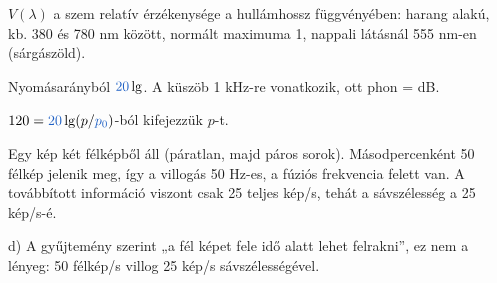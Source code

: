 $V(\lambda)$ a szem relatív érzékenysége a hullámhossz függvényében: harang alakú, kb. 380 és 780 nm között, normált maximuma 1, nappali látásnál 555 nm-en (sárgászöld).

Nyomásarányból ${\ca{20}}\lg$. A küszöb 1 kHz-re vonatkozik, ott phon = dB.

\begin{center}\end{center}

$120={\ca{20}}\lg(p/{\ca{p_0}})$-ból kifejezzük $p$-t.

\begin{center}\end{center}

Egy kép két félképből áll (páratlan, majd páros sorok). Másodpercenként 50 félkép jelenik meg, így a villogás 50 Hz-es, a fúziós frekvencia felett van. A továbbított információ viszont csak 25 teljes kép/s, tehát a sávszélesség a 25 kép/s-é.
\begin{figyelem}[Javítás]
d) A gyűjtemény szerint „a fél képet fele idő alatt lehet felrakni”, ez nem a lényeg: 50 félkép/s villog 25 kép/s sávszélességével.
\end{figyelem}
\begin{eredmeny}

\begin{center}\end{center}
\end{eredmeny}
